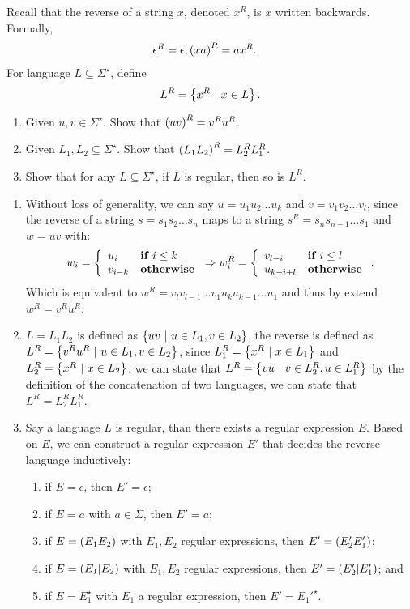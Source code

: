 \documentclass{article}
\begin{document}
\begin{exercise}
Recall that the reverse of a string $x$, denoted $x^R$, is $x$ written backwards. Formally,
\begin{eqnarray}
\epsilon^R=\epsilon;&\left( xa \right)^R=ax^R.
\end{eqnarray}
For language $L\subseteq\Sigma^{\star}$, define
\begin{equation}
L^R=\left\{ x^R\ |\ x\in L \right\}.
\end{equation}
\begin{enumerate}
 \item Given $u,v\in\Sigma^{\star}$. Show that $\left( uv \right)^R=v^Ru^R$.
 \item Given $L_1,L_2\subseteq\Sigma^{\star}$. Show that $\left( L_1 L_2 \right)^R=L_2^RL_1^R$.
 \item Show that for any $L\subseteq\Sigma^{\star}$, if $L$ is regular, then so is $L^R$.
\end{enumerate}
\begin{answer}
\begin{enumerate}
 \item Without loss of generality, we can say $u=u_1u_2\ldots u_k$ and $v=v_1v_2\ldots v_l$, since the reverse of a string $s=s_1s_2\ldots s_n$ maps to a string $s^R=s_ns_{n-1}\ldots s_1$ and $w=uv$ with:
 \begin{equation}
  w_i=\left\{\begin{array}{ll} u_i&\mbox{\bf if } i\leq k\\v_{i-k}&\mbox{\bf otherwise} \end{array}\right.\Rightarrow w_i^R=\left\{\begin{array}{ll} v_{l-i}&\mbox{\bf if } i\leq l\\u_{k-i+l}&\mbox{\bf otherwise} \end{array}\right..
 \end{equation}
Which is equivalent to $w^R=v_lv_{l-1}\ldots v_1u_ku_{k-1}\ldots u_1$ and thus by extend $w^R=v^Ru^R$.
 \item $L=L_1L_2$ is defined as $\left\{ uv\ |\ u\in L_1,v\in L_2 \right\}$, the reverse is defined as $L^R=\left\{ v^Ru^R\ |\ u\in L_1,v\in L_2 \right\}$, since $L_1^R=\left\{ x^R\ |\ x\in L_1 \right\}$ and $L_2^R=\left\{ x^R\ |\ x\in L_2 \right\}$, we can state that $L^R=\left\{ vu\ |\ v\in L_2^R,u\in L_1^R \right\}$ by the definition of the concatenation of two languages, we can state that $L^R=L_2^RL_1^R$.
 \item Say a language $L$ is regular, than there exists a regular expression $E$. Based on $E$, we can construct a regular expression $E'$ that decides the reverse language inductively:
 \begin{enumerate}
  \item if $E=\epsilon$, then $E'=\epsilon$;
  \item if $E=a$ with $a\in\Sigma$, then $E'=a$;
  \item if $E=\left( E_1E_2 \right)$ with $E_1,E_2$ regular expressions, then $E'=\left( E_2'E_1' \right)$;
  \item if $E=\left( E_1|E_2 \right)$ with $E_1,E_2$ regular expressions, then $E'=\left( E_2'|E_1' \right)$; and
  \item if $E=E_1^{\star}$ with $E_1$ a regular expression, then $E'=E_1'^{\star}$.
 \end{enumerate}
\end{enumerate}

\end{answer}
\end{exercise}
\end{document}
